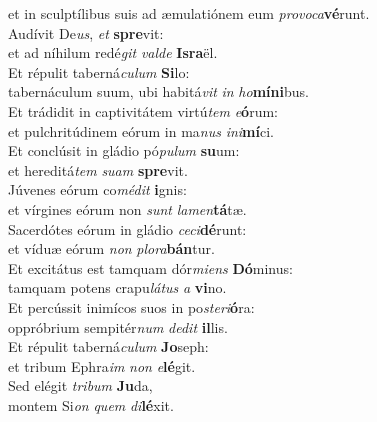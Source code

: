 \evenverse et in sculptílibus suis ad æmulatiónem eum \textit{pro}\textit{vo}\textit{ca}\textbf{vé}runt.\\
\oddverse Audívit De\textit{us}, \textit{et} \textbf{spre}vit:~\*\\
\oddverse et ad níhilum redé\textit{git} \textit{val}\textit{de} \textbf{Is}\textbf{ra}ël.\\
\evenverse Et répulit taberná\textit{cu}\textit{lum} \textbf{Si}lo:~\*\\
\evenverse tabernáculum suum, ubi habitá\textit{vit} \textit{in} \textit{ho}\textbf{mí}\textbf{ni}bus.\\
\oddverse Et trádidit in captivitátem virtú\textit{tem} \textit{e}\textbf{ó}rum:~\*\\
\oddverse et pulchritúdinem eórum in ma\textit{nus} \textit{i}\textit{ni}\textbf{mí}ci.\\
\evenverse Et conclúsit in gládio pó\textit{pu}\textit{lum} \textbf{su}um:~\*\\
\evenverse et hereditá\textit{tem} \textit{su}\textit{am} \textbf{spre}vit.\\
\oddverse Júvenes eórum co\textit{mé}\textit{dit} \textbf{i}gnis:~\*\\
\oddverse et vírgines eórum non \textit{sunt} \textit{la}\textit{men}\textbf{tá}tæ.\\
\evenverse Sacerdótes eórum in gládio \textit{ce}\textit{ci}\textbf{dé}runt:~\*\\
\evenverse et víduæ eórum \textit{non} \textit{plo}\textit{ra}\textbf{bán}tur.\\
\oddverse Et excitátus est tamquam dór\textit{mi}\textit{ens} \textbf{Dó}minus:~\*\\
\oddverse tamquam potens crapu\textit{lá}\textit{tus} \textit{a} \textbf{vi}no.\\
\evenverse Et percússit inimícos suos in po\textit{ste}\textit{ri}\textbf{ó}ra:~\*\\
\evenverse oppróbrium sempitér\textit{num} \textit{de}\textit{dit} \textbf{il}lis.\\
\oddverse Et répulit taberná\textit{cu}\textit{lum} \textbf{Jo}seph:~\*\\
\oddverse et tribum Ephra\textit{im} \textit{non} \textit{e}\textbf{lé}git.\\
\evenverse Sed elégit \textit{tri}\textit{bum} \textbf{Ju}da,~\*\\
\evenverse montem Si\textit{on} \textit{quem} \textit{di}\textbf{lé}xit.\\
